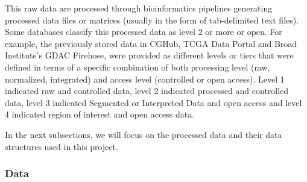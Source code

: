 This raw data are processed through bioinformatics pipelines generating
processed data files or matrices (usually in the form of tab-delimited text files).
Some databases classify this processed data as level 2 or more or open.
For example, the previously stored data in CGHub, TCGA Data Portal and Broad Institute’s GDAC Firehose, were provided as different levels or tiers that were defined in terms of a specific combination of both processing level (raw, normalized, integrated) and access level (controlled or open access). Level 1 indicated raw and controlled data, level 2 indicated processed and controlled data, level 3 indicated Segmented or Interpreted Data and open access and level 4 indicated region of interest and open access data.

In the next subsections, we will focus on the processed data and their data
structures used in this project.

\subsubsection{Data}

